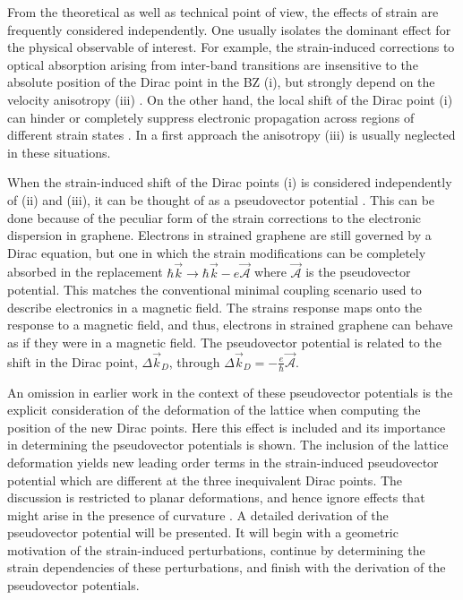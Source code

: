 From the theoretical as well as technical point of view, the effects of strain are frequently considered independently.
One usually isolates the dominant effect for the physical observable of interest.
For example, the strain-induced corrections to optical absorption arising from inter-band transitions are insensitive to the absolute position of the Dirac point in the BZ (i), but strongly depend on the velocity anisotropy (iii) \cite{Pereira2010c,Pellegrino2010}.
On the other hand, the local shift of the Dirac point (i) can hinder or completely suppress electronic propagation across regions of different strain states \cite{Pereira2009a,Fogler2008}.
In a first approach the anisotropy (iii) is usually neglected in these situations\cite{Fogler2008,Pereira2009a}.

When the strain-induced shift of the Dirac points (i) is considered independently of (ii) and (iii), it can be thought of as a pseudovector potential \cite{Sasaki2005,Ando2006,Manes2007,CastroNeto2009,Vozmediano2010}.
This can be done because of the peculiar form of the strain corrections to the electronic dispersion in graphene.
Electrons in strained graphene are still governed by a Dirac equation, but one in which the strain modifications can be completely absorbed in the replacement $\hbar \vec{k} \to \hbar \vec{k}-e \vec{\mathcal{A}}$ where $\vec{\mathcal{A}}$ is the pseudovector potential.
This matches the conventional minimal coupling scenario used to describe electronics in a magnetic field.
The strains response maps onto the response to a magnetic field, and thus, electrons in strained graphene can behave as if they were in a magnetic field.  
The pseudovector potential is related to the shift in the Dirac point, $\Delta \vec{k}_D$, through $\Delta \vec{k}_D=-\frac{e}{\hbar} \vec{\mathcal{A}}$.

An omission in earlier work in the context of these pseudovector potentials is the explicit consideration of the deformation of the lattice when computing the position of the new Dirac points.
Here this effect is included and its importance in determining the pseudovector potentials is shown.
The inclusion of the lattice deformation yields new leading order terms in the strain-induced pseudovector potential which are different at the three inequivalent Dirac points.
The discussion is restricted to planar deformations, and hence ignore effects that might arise in the presence of curvature \cite{CastroNeto2009,Vozmediano2010}.
A detailed derivation of the pseudovector potential will be presented.
It will begin with a geometric motivation of the strain-induced perturbations, continue by determining the strain dependencies of these perturbations, and finish with the derivation of the pseudovector potentials.

